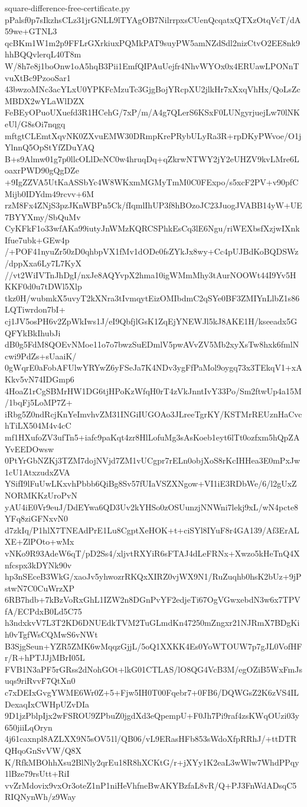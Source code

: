 \documentclass[11pt]{article}
\theoremstyle{definition}
\theoremstyle{remark}
\begin{document}
\begin{filecontents*}[overwrite]{square-difference-free-certificate.py}
pPalsf0p7sIkzhsCLz31jrGNLL9lTYAgOB7NilrrpxsCUenQcqatxQTXzOtqVcT/dA59we+GTNL3
qcBKm1W1m2p9FFLrGXrkiuxPQMkPAT9suyPW5amNZdSdl2nizCtvO2EE8nk9hhBQQvlerqL40T8m
W/8h7e8j1boOnw1oA5hqB3Pii1EmfQIPAuUejfr4NhvWYOx0x4ERUawLPONnTvuXtBc9PzooSar1
43bwzoMNc3acYLxU0YPKFcMzuTc3GjgBojYRcpXU2jlkHr7xXxqVhHx/QoLsZcMBDX2wYLaWlDZX
FeBEyOPuoUXuefd3R1HCehG/7xP/m/A4g7QLerS6KSxF0LUNgyrjuejLw70lNKeUl/G8sOi7nqgq
mftgtCLEmtXqvNK0ZXvuEMW30DRmpKrePRybULyRa3R+rpDKyPWvoe/O1jYlnnQ5OpStYfZDuYAQ
B+s9Almw01g7p0llcOLlDeNC0w4hruqDq+qZkrwNTWY2jY2eUHZV9kvLMre6LoaxrPWD90gQgDZe
+9IgZZVA5UtKaASSbYc4W8WKxmMGMyTmM0C0FExpo/s5xcF2PV+v90pfCMijb0IDYdm49rcvv+6M
rzM8Fx4ZNjS3pzJKnWBPn5Ck/fIqmlIhUP3f8hBOzoJC23JuogJVABB14yW+UE7BYYXmy/SbQuMv
CyKFkF1o33wfAKa99iutyJnWMzKQRCSPhkEsCq3lE6Ngu/riWEXbsfXzjwIXnkIfue7ubk+GEw4p
/+POF41nyuZr50zD0qhbpVX1fMv1dODe0fsZYkJx8wy+Cc4pUJBdKoBQDSWz/dppXxa6Ly7L7KyX
//vt2WiIVTnJhDgI/nxJe8AQYvpX2hma10igWMmMhy3tAurNOOWt44I9Yv5HKKF0d0u7tDWl5Xlp
tkz0H/wubmkX5uvyT2kXNra3tIvmqytEizOMIbdmC2qSYe0BF3ZMIYnLlbZ1s86LQTiwrdon7bI+
cj1JV5osPH6v2ZpWkIws1J/eI9QbfjlGsK1ZqEjYNEWJl5kJ8AKE1H/kseeadx5GQFYkBkIhubJi
dB0g5FdM8QOEvNMoe11o7o7bwzSuEDmlV5pwAVvZV5Mb2xyXsTw8hxk6fmlNcwi9PdZs+sUaaiK/
0gWqrE0aFobAFUlwYRYwZ6yFSeJa7K4NDv3ygFfPaMol9oygq73x3TEkqV1+xAKkv5vN74IDGmp6
4HoaZ1rCgSBMrHW1DG6tjHPoKzWfqH0rT4zVkJnntIvY33Po/Sm2ftwUp4a15M/1bqFj5LoMP7Z+
iRbg5Z0ndRcjKnYeImvhvZM31INGiIUGOAo3JLreeTgrKY/KSTMrREUznHaCvchTiLX504M4v4cC
mf1HXufoZV3ufTn5+iafc9paKqt4zr8HlLofuMg3sAsKoeb1eyt6lTt0ozfxm5hQpZAYvEEDOwsw
0PtYrGbNZKj3TZM7dojNVjd7ZM1vUCgpr7rELn0objXoS8rKcIHHea3E0mPxJw1cU1AtxzudxZVA
YSifI9lFuUwLKxvhPbbb6QiBg8Sv57fUIaVSZXNgow+VI1iE3RDbWe/6/l2gUxZNORMKKzUroPvN
yAU4iE0Vr9euJ/DdEYwa6QD3Uv2kYHSo0zOSUunzjNNWni7lekj9xL/wN4pcte8YFq8ziGFNxvN0
d7zkIq/P1hlX7TNEAdPrE1Lu8CgptXeHOK+t+ciSYl8IYuF8r4GA139/Af3ErALXE+ZlPOto+wMx
vNKo9R93AdeW6qT/pD2Ss4/xljvtRXYiR6sFTAJ4dLeFRNx+Xwzo5kHeTnQ4Xnfcspx3kDYNk90v
hp3nSEceB3WkG/xaoJv5yhwozrRKQxXIRZ0vjWX9N1/RuZuqhb0hsK2bUz+9jPstwN7C0CuWrzXP
6RB7hdb+7kBzVoRxGhL1IZW2n8DGnPvYF2edjeTi67OgVGwxebdN3w6x7TPVfA/ECPdxB0Ld5C75
h3ndxkvV7L3T2KD6DNUEdkTVM2TuGLmdKn47250mZngxr21NJRmX7BDgKih0vTgfWsCQMwS6vNWt
B3SjgSeun+YZR5ZMK6wMqqzGjjL/5oQ1XXKK4Es0YoWTOUW7p7gJL0VofHFr/R+hPTJJjMBrI05L
FVB1N3aPF5rGRss2dNohGOt+lkG01CTLAS/lO8QG4VcB3M/egOZiB5WxFmJsuqs9riRvvF7QtXn0
c7xDEIxGvgYWME6Wr0Z+5+Fjw5IH0T00Fqebr7+0FB6/DQWGsZ2K6zVS4ILDexaqIxCWHpUZvDIa
9D1jzPblpIjx2wFSROU9ZPbuZ0jgdXd3eQpempU+F0Jh7Pi9raf4zsKWqOUzi03y650jiiLqOryn
4j61caxnpl8AZLXX9N5sOV51l/QB06/vL9ERasHFb853sWdoXfpRRhJ/+ttDTRQHqoGnSvVW/Q8X
K/RfkMBOhhXsu2BlNly2qrEu18R8hXCKtG/r+jXYy1K2eaL3wWlw7WhdPPqy1lBze79rsUtt+RiI
vvZrMdovix9vxOr3oteZ1nP1niHeVhfneBwAKYBzfaL8vR/Q+PJ3FnWdADsqC5RIQNynWh/z9Way

\end{filecontents*}
\end{document}
